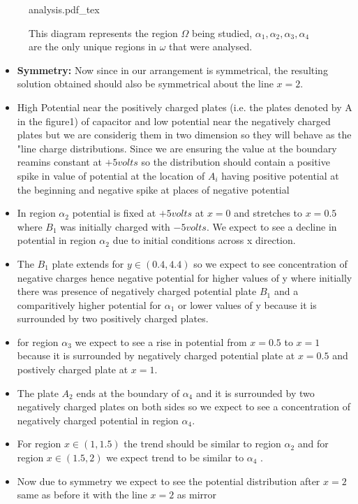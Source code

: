 \begin{figure}[ht]
    \centering
    \def\svgwidth{0.5\textwidth}
    {analysis.pdf_tex}
    \caption{This diagram represents the region $\Omega$ being studied, $\alpha_1,\alpha_2,\alpha_3,\alpha_4$ are the only unique regions in $\omega$ that were analysed.}
    \label{}
\end{figure}
\begin{itemize}
    \item \textbf{Symmetry: } Now since in our arrangement is symmetrical, the resulting solution obtained should also be symmetrical about the line $x = 2$. 
    \item High Potential near the positively charged plates (i.e. the plates denoted by A  in the figure1) of capacitor and low potential near the negatively charged plates but we are considerig them in two dimension so they will behave as the "line charge distributions. Since we are ensuring the value at the boundary reamins constant at $ +5 volts $ so the distribution should contain a positive spike in value of potential at the location of $A_i$  having positive potential at the beginning and negative spike at places of negative potential
    \item  In region $ \alpha_2 $ potential is fixed at $ + 5 volts $ at $ x = 0 $ and stretches to $ x = 0.5 $ where $ B_1 $ was initially charged with $ - 5 volts $. We expect to see a decline in potential in region $ \alpha_2 $ due to initial conditions across x direction.
    \item The  $ B_1 $ plate extends for $ y \in (0.4, 4.4)  $ so we expect to see concentration of negative charges hence negative potential  for  higher values  of y where initially there was presence of negatively charged potential plate $ B_1 $ and a comparitively higher potential for $ \alpha_1 $ or lower values of y because it is surrounded by two positively charged plates.
    \item for region $ \alpha_3   $  we expect to see a rise  in potential from $ x = 0.5 $ to $ x = 1 $  because it is surrounded by negatively charged potential plate at $ x = 0.5 $ and postively charged plate at  $ x = 1 $.
    \item The plate $ A_2 $ ends at the boundary of $ \alpha_4 $ and it is surrounded by two negatively charged plates on both sides so we expect to see a concentration of negatively charged potential in region $ \alpha_4 $.
    \item For region $ x \in (1 , 1.5) $ the trend should be similar to region $ \alpha_2 $ and for region $ x \in (1.5, 2) $ we expect  trend to be similar to $ \alpha_4 $ . 
    \item Now due to symmetry we expect to see the potential distribution after $ x = 2 $ same as before it with the line $ x = 2 $ as mirror
\end{itemize}

